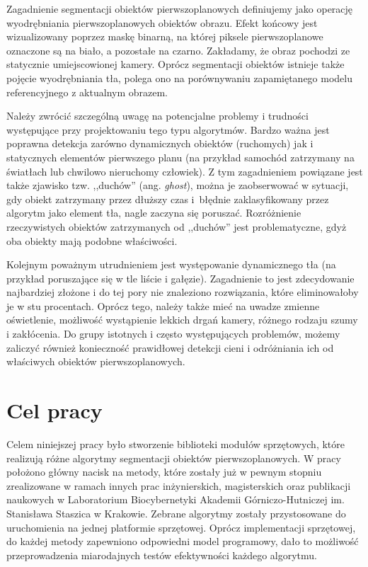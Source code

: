 Zagadnienie segmentacji obiektów pierwszoplanowych definiujemy jako operację wyodrębniania pierwszoplanowych obiektów obrazu. Efekt końcowy jest wizualizowany poprzez maskę binarną, na której piksele pierwszoplanowe oznaczone są na biało, a pozostałe na czarno. Zakładamy, że obraz pochodzi ze statycznie umiejscowionej kamery. Oprócz segmentacji obiektów istnieje także pojęcie wyodrębniania tła, polega ono na porównywaniu zapamiętanego modelu referencyjnego z aktualnym obrazem.

Należy zwrócić szczególną uwagę na potencjalne problemy i trudności występujące przy projektowaniu tego typu algorytmów. Bardzo ważna jest poprawna detekcja zarówno dynamicznych obiektów (ruchomych) jak i statycznych elementów pierwszego planu (na przykład samochód zatrzymany na światłach lub chwilowo nieruchomy człowiek). Z tym zagadnieniem powiązane jest także zjawisko tzw. ,,duchów'' (ang. \textit{ghost}), można je zaobserwować w sytuacji, gdy obiekt zatrzymany przez dłuższy czas i~błędnie zaklasyfikowany przez algorytm jako element tła, nagle zaczyna się poruszać. Rozróżnienie rzeczywistych obiektów zatrzymanych od ,,duchów'' jest problematyczne, gdyż oba obiekty mają podobne właściwości. 

Kolejnym poważnym utrudnieniem jest występowanie dynamicznego tła (na przykład poruszające się w tle liście i gałęzie). Zagadnienie to jest zdecydowanie najbardziej złożone i do tej pory nie znaleziono rozwiązania, które eliminowałoby je w stu procentach. Oprócz tego, należy także mieć na uwadze zmienne oświetlenie, możliwość wystąpienie lekkich drgań kamery, różnego rodzaju szumy i zakłócenia. Do grupy istotnych i często występujących problemów, możemy zaliczyć również konieczność prawidłowej detekcji cieni i odróżniania ich od właściwych obiektów pierwszoplanowych.

\section{Cel pracy}
\label{sec:wprowadzenie_cel_pracy}

Celem niniejszej pracy było stworzenie biblioteki modułów sprzętowych, które realizują różne algorytmy segmentacji obiektów pierwszoplanowych. W pracy położono główny nacisk na metody, które zostały już w pewnym stopniu zrealizowane w ramach innych prac inżynierskich, magisterskich oraz publikacji naukowych w Laboratorium Biocybernetyki Akademii Górniczo-Hutniczej im. Stanisława Staszica w Krakowie. Zebrane algorytmy zostały przystosowane do uruchomienia na jednej platformie sprzętowej. Oprócz implementacji sprzętowej, do każdej metody zapewniono odpowiedni model programowy, dało to możliwość przeprowadzenia miarodajnych testów efektywności każdego algorytmu.


